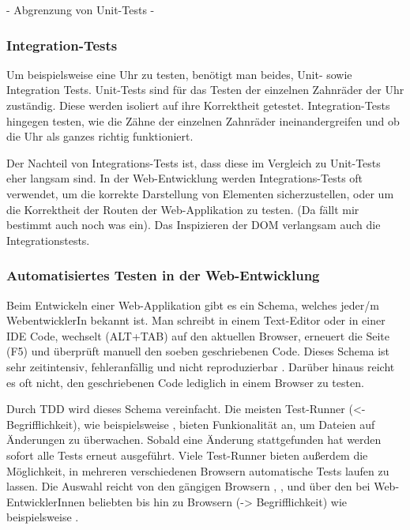  - Abgrenzung von Unit-Tests -

\subsubsection{Integration-Tests}
Um beispielsweise eine Uhr zu testen, benötigt man beides, Unit- sowie Integration Tests. Unit-Tests sind für das Testen der einzelnen Zahnräder der Uhr zuständig. Diese werden isoliert auf ihre Korrektheit getestet. Integration-Tests hingegen testen, wie die Zähne der einzelnen Zahnräder ineinandergreifen und ob die Uhr als ganzes richtig funktioniert.

Der Nachteil von Integrations-Tests ist, dass diese im Vergleich zu Unit-Tests eher langsam sind. In der Web-Entwicklung werden Integrations-Tests oft verwendet, um die korrekte Darstellung von Elementen sicherzustellen, oder um die Korrektheit der Routen der Web-Applikation zu testen. (Da fällt mir bestimmt auch noch was ein). Das Inspizieren der DOM verlangsam auch die Integrationstests.

\subsubsection{Automatisiertes Testen in der Web-Entwicklung}
Beim Entwickeln einer Web-Applikation gibt es ein Schema, welches jeder/m WebentwicklerIn bekannt ist. Man schreibt in einem Text-Editor oder in einer IDE Code, wechselt (ALT+TAB) auf den aktuellen Browser, erneuert die Seite (F5) und überprüft manuell den soeben geschriebenen Code. Dieses Schema ist sehr zeitintensiv, fehleranfällig und nicht reproduzierbar \autocite[3]{Johansen:2011}. Darüber hinaus reicht es oft nicht, den geschriebenen Code lediglich in einem Browser zu testen.

Durch TDD wird dieses Schema vereinfacht. Die meisten Test-Runner (<- Begrifflichkeit), wie beispielsweise , bieten Funkionalität an, um Dateien auf Änderungen zu überwachen. Sobald eine Änderung stattgefunden hat werden sofort alle Tests erneut ausgeführt. Viele Test-Runner bieten außerdem die Möglichkeit, in mehreren verschiedenen Browsern automatische Tests laufen zu lassen. Die Auswahl reicht von den gängigen Browsern , ,  und  über den bei Web-EntwicklerInnen beliebten  bis hin zu  Browsern (-> Begrifflichkeit) wie beispielsweise .

